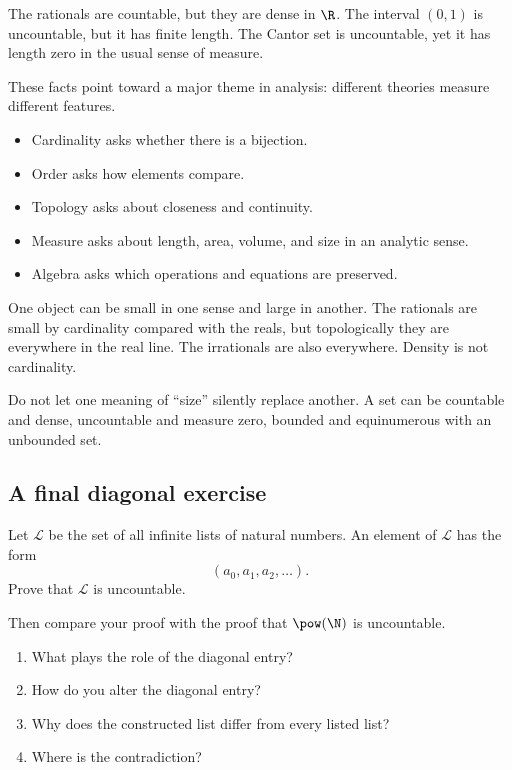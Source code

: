 The rationals are countable, but they are dense in $\R$. The interval $(0,1)$ is uncountable, but it has finite length. The Cantor set is uncountable, yet it has length zero in the usual sense of measure.

These facts point toward a major theme in analysis: different theories measure different features.

\begin{itemize}
\item Cardinality asks whether there is a bijection.
\item Order asks how elements compare.
\item Topology asks about closeness and continuity.
\item Measure asks about length, area, volume, and size in an analytic sense.
\item Algebra asks which operations and equations are preserved.
\end{itemize}

One object can be small in one sense and large in another. The rationals are small by cardinality compared with the reals, but topologically they are everywhere in the real line. The irrationals are also everywhere. Density is not cardinality.

\begin{trapbox}
Do not let one meaning of ``size'' silently replace another. A set can be countable and dense, uncountable and measure zero, bounded and equinumerous with an unbounded set.
\end{trapbox}

\subsection{A final diagonal exercise}

\begin{labbox}
Let $\mathcal{L}$ be the set of all infinite lists of natural numbers. An element of $\mathcal{L}$ has the form
\[
(a_0,a_1,a_2,\ldots).
\]
Prove that $\mathcal{L}$ is uncountable.

Then compare your proof with the proof that $\pow(\N)$ is uncountable.

\begin{enumerate}
\item What plays the role of the diagonal entry?
\item How do you alter the diagonal entry?
\item Why does the constructed list differ from every listed list?
\item Where is the contradiction?
\end{enumerate}
\end{labbox}

